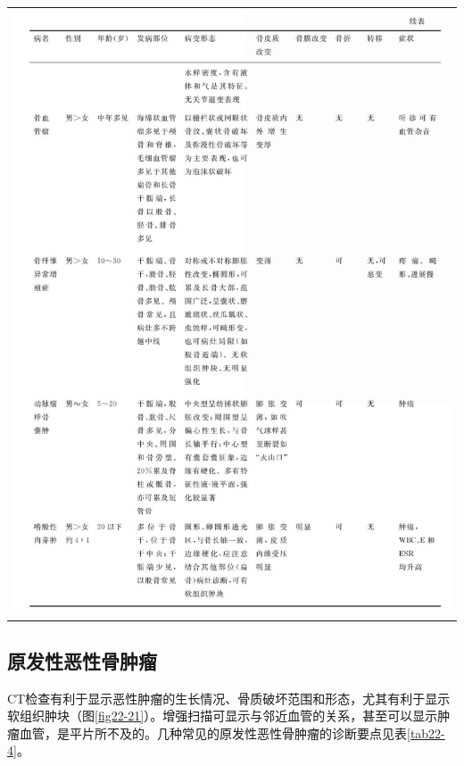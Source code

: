\begin{longtable}{c}
\includegraphics[width=\textwidth,height=\textheight,keepaspectratio]{./images/Image00444.jpg}
\end{longtable}



\subsection{原发性恶性骨肿瘤}

CT检查有利于显示恶性肿瘤的生长情况、骨质破坏范围和形态，尤其有利于显示软组织肿块（图\ref{fig22-21}）。增强扫描可显示与邻近血管的关系，甚至可以显示肿瘤血管，是平片所不及的。几种常见的原发性恶性骨肿瘤的诊断要点见表\ref{tab22-4}。

